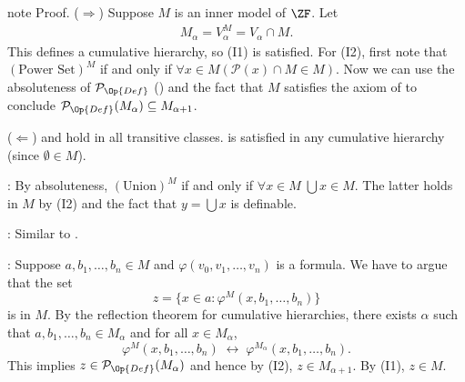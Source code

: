 \documentclass[letterpaper,10pt,english]{jupyterBook}
\begin{document}
\begin{sphinxadmonition}{note}
\sphinxAtStartPar
Proof. (\(\Rightarrow\)) Suppose \(M\) is an inner model of \(\ZF\). Let
\begin{equation*}
\begin{split}
M_\alpha = V_\alpha^M = V_\alpha \cap M.
\end{split}
\end{equation*}
\sphinxAtStartPar
This defines a cumulative hierarchy, so (I1) is satisfied.
For (I2), first note that \((\text{Power Set})^M\) if and only if \(\forall x \in M (\mathcal{P}(x) \cap M \in M)\). Now we can use the absoluteness of \(\mathcal{P}_{\Op{Def}}\) ({\hyperref[\detokenize{constructible:thm-definability-Pdef}]{}}) and the fact that \(M\) satisfies the axiom of  to conclude \(\mathcal{P}_{\Op{Def}}(M_\alpha) \subseteq M_{\alpha+1}\).

\sphinxAtStartPar
(\(\Leftarrow\))
 and  hold in all transitive classes.  is satisfied in any cumulative hierarchy (since \(\emptyset \in M\)).

\sphinxAtStartPar
{}: By absoluteness, \((\text{Union})^M\) if and only if \(\forall x \in M \; \bigcup x \in M\). The latter holds in \(M\) by (I2) and the fact that \(y = \bigcup x\) is definable.

\sphinxAtStartPar
{}: Similar to .

\sphinxAtStartPar
{}: Suppose \(a, b_1, \dots, b_n \in M\) and \(\varphi(v_0, v_1, \dots, v_n)\) is a formula. We have to argue that the set
\begin{equation*}
	z = \{ x \in a \colon \varphi^M(x, b_1, \dots, b_n) \}
\end{equation*}
\sphinxAtStartPar
is in \(M\). By the reflection theorem for cumulative hierarchies, there exists \(\alpha\) such that \(a, b_1, \dots, b_n \in M_\alpha\) and for all \(x \in M_\alpha\),
\begin{equation*}
	\varphi^M(x, b_1, \dots, b_n) \; \leftrightarrow \; \varphi^{M_\alpha}(x, b_1, \dots, b_n).
\end{equation*}
\sphinxAtStartPar
This implies \(z \in \mathcal{P}_{\Op{Def}}(M_\alpha)\) and hence by (I2), \(z \in M_{\alpha+1}\). By (I1), \(z \in M\).


\end{sphinxadmonition}
\end{document}
